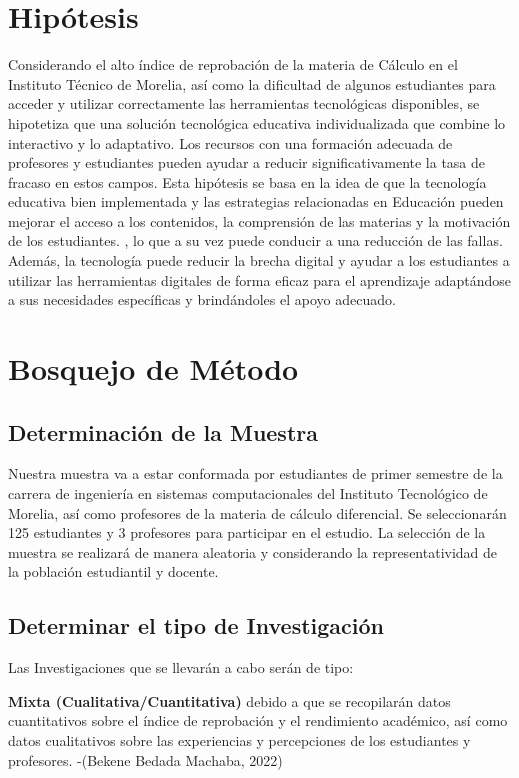 \documentclass{article}
\begin{document}
\section{Hipótesis}
Considerando el alto índice de reprobación de la materia de Cálculo en el Instituto Técnico de Morelia, así como la dificultad de algunos estudiantes para acceder y utilizar correctamente las herramientas tecnológicas disponibles, se hipotetiza que una solución tecnológica educativa individualizada que combine lo interactivo y lo adaptativo. Los recursos con una formación adecuada de profesores y estudiantes pueden ayudar a reducir significativamente la tasa de fracaso en estos campos. Esta hipótesis se basa en la idea de que la tecnología educativa bien implementada y las estrategias relacionadas en Educación pueden mejorar el acceso a los contenidos, la comprensión de las materias y la motivación de los estudiantes. , lo que a su vez puede conducir a una reducción de las fallas. Además, la tecnología puede reducir la brecha digital y ayudar a los estudiantes a utilizar las herramientas digitales de forma eficaz para el aprendizaje adaptándose a sus necesidades específicas y brindándoles el apoyo adecuado.

\section{Bosquejo de Método}
\subsection{Determinación de la Muestra}
Nuestra muestra va a estar conformada por estudiantes de primer semestre de la carrera de ingeniería en sistemas computacionales del Instituto Tecnológico de Morelia, así como profesores de la materia de cálculo diferencial. Se seleccionarán 125 estudiantes y 3 profesores para participar en el estudio. La selección de la muestra se realizará de manera aleatoria y considerando la representatividad de la población estudiantil y docente.
\subsection{Determinar el tipo de Investigación}
Las Investigaciones que se llevarán a cabo serán de tipo:

\textbf{Mixta (Cualitativa/Cuantitativa)} debido a que se recopilarán datos cuantitativos sobre el índice de reprobación y el rendimiento académico, así como datos cualitativos sobre las experiencias y percepciones de los estudiantes y profesores. \cite{Bekene}-(Bekene Bedada Machaba, 2022)
\end{document}
